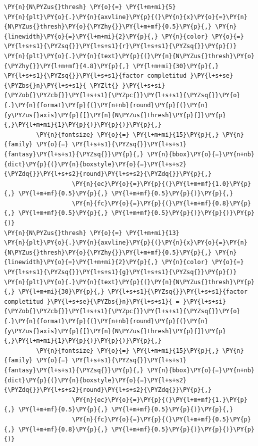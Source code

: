 \begin{tcolorbox}[breakable, size=fbox, boxrule=1pt, pad at break*=1mm,colback=cellbackground, colframe=cellborder]
\begin{Verbatim}[commandchars=\\\{\}]
\PY{n}{N\PYZus{}thresh} \PY{o}{=} \PY{l+m+mi}{5}
\PY{n}{plt}\PY{o}{.}\PY{n}{axvline}\PY{p}{(}\PY{n}{x}\PY{o}{=}\PY{n}{N\PYZus{}thresh}\PY{o}{\PYZhy{}}\PY{l+m+mf}{0.5}\PY{p}{,} \PY{n}{linewidth}\PY{o}{=}\PY{l+m+mi}{2}\PY{p}{,} \PY{n}{color} \PY{o}{=} \PY{l+s+s1}{\PYZsq{}}\PY{l+s+s1}{r}\PY{l+s+s1}{\PYZsq{}}\PY{p}{)}
\PY{n}{plt}\PY{o}{.}\PY{n}{text}\PY{p}{(}\PY{n}{N\PYZus{}thresh}\PY{o}{\PYZhy{}}\PY{l+m+mf}{4.8}\PY{p}{,} \PY{l+m+mi}{30}\PY{p}{,} \PY{l+s+s1}{\PYZsq{}}\PY{l+s+s1}{factor completitud }\PY{l+s+se}{\PYZbs{}n}\PY{l+s+s1}{ \PYZlt{} }\PY{l+s+si}{\PYZob{}\PYZcb{}}\PY{l+s+s1}{\PYZpc{}}\PY{l+s+s1}{\PYZsq{}}\PY{o}{.}\PY{n}{format}\PY{p}{(}\PY{n+nb}{round}\PY{p}{(}\PY{n}{y\PYZus{}axis}\PY{p}{[}\PY{n}{N\PYZus{}thresh}\PY{p}{]}\PY{p}{,}\PY{l+m+mi}{1}\PY{p}{)}\PY{p}{)}\PY{p}{,}
         \PY{n}{fontsize} \PY{o}{=} \PY{l+m+mi}{15}\PY{p}{,} \PY{n}{family} \PY{o}{=} \PY{l+s+s1}{\PYZsq{}}\PY{l+s+s1}{fantasy}\PY{l+s+s1}{\PYZsq{}}\PY{p}{,} \PY{n}{bbox}\PY{o}{=}\PY{n+nb}{dict}\PY{p}{(}\PY{n}{boxstyle}\PY{o}{=}\PY{l+s+s2}{\PYZdq{}}\PY{l+s+s2}{round}\PY{l+s+s2}{\PYZdq{}}\PY{p}{,}
                   \PY{n}{ec}\PY{o}{=}\PY{p}{(}\PY{l+m+mf}{1.0}\PY{p}{,} \PY{l+m+mf}{0.5}\PY{p}{,} \PY{l+m+mf}{0.5}\PY{p}{)}\PY{p}{,}
                   \PY{n}{fc}\PY{o}{=}\PY{p}{(}\PY{l+m+mf}{0.8}\PY{p}{,} \PY{l+m+mf}{0.5}\PY{p}{,} \PY{l+m+mf}{0.5}\PY{p}{)}\PY{p}{)}\PY{p}{)}
\PY{n}{N\PYZus{}thresh} \PY{o}{=} \PY{l+m+mi}{13}
\PY{n}{plt}\PY{o}{.}\PY{n}{axvline}\PY{p}{(}\PY{n}{x}\PY{o}{=}\PY{n}{N\PYZus{}thresh}\PY{o}{\PYZhy{}}\PY{l+m+mf}{0.5}\PY{p}{,} \PY{n}{linewidth}\PY{o}{=}\PY{l+m+mi}{2}\PY{p}{,} \PY{n}{color} \PY{o}{=} \PY{l+s+s1}{\PYZsq{}}\PY{l+s+s1}{g}\PY{l+s+s1}{\PYZsq{}}\PY{p}{)}
\PY{n}{plt}\PY{o}{.}\PY{n}{text}\PY{p}{(}\PY{n}{N\PYZus{}thresh}\PY{p}{,} \PY{l+m+mi}{30}\PY{p}{,} \PY{l+s+s1}{\PYZsq{}}\PY{l+s+s1}{factor completitud }\PY{l+s+se}{\PYZbs{}n}\PY{l+s+s1}{ = }\PY{l+s+si}{\PYZob{}\PYZcb{}}\PY{l+s+s1}{\PYZpc{}}\PY{l+s+s1}{\PYZsq{}}\PY{o}{.}\PY{n}{format}\PY{p}{(}\PY{n+nb}{round}\PY{p}{(}\PY{n}{y\PYZus{}axis}\PY{p}{[}\PY{n}{N\PYZus{}thresh}\PY{p}{]}\PY{p}{,}\PY{l+m+mi}{1}\PY{p}{)}\PY{p}{)}\PY{p}{,}
         \PY{n}{fontsize} \PY{o}{=} \PY{l+m+mi}{15}\PY{p}{,} \PY{n}{family} \PY{o}{=} \PY{l+s+s1}{\PYZsq{}}\PY{l+s+s1}{fantasy}\PY{l+s+s1}{\PYZsq{}}\PY{p}{,} \PY{n}{bbox}\PY{o}{=}\PY{n+nb}{dict}\PY{p}{(}\PY{n}{boxstyle}\PY{o}{=}\PY{l+s+s2}{\PYZdq{}}\PY{l+s+s2}{round}\PY{l+s+s2}{\PYZdq{}}\PY{p}{,}
                   \PY{n}{ec}\PY{o}{=}\PY{p}{(}\PY{l+m+mf}{1.}\PY{p}{,} \PY{l+m+mf}{0.5}\PY{p}{,} \PY{l+m+mf}{0.5}\PY{p}{)}\PY{p}{,}
                   \PY{n}{fc}\PY{o}{=}\PY{p}{(}\PY{l+m+mf}{0.5}\PY{p}{,} \PY{l+m+mf}{0.8}\PY{p}{,} \PY{l+m+mf}{0.5}\PY{p}{)}\PY{p}{)}\PY{p}{)}


\end{Verbatim}
\end{tcolorbox}
